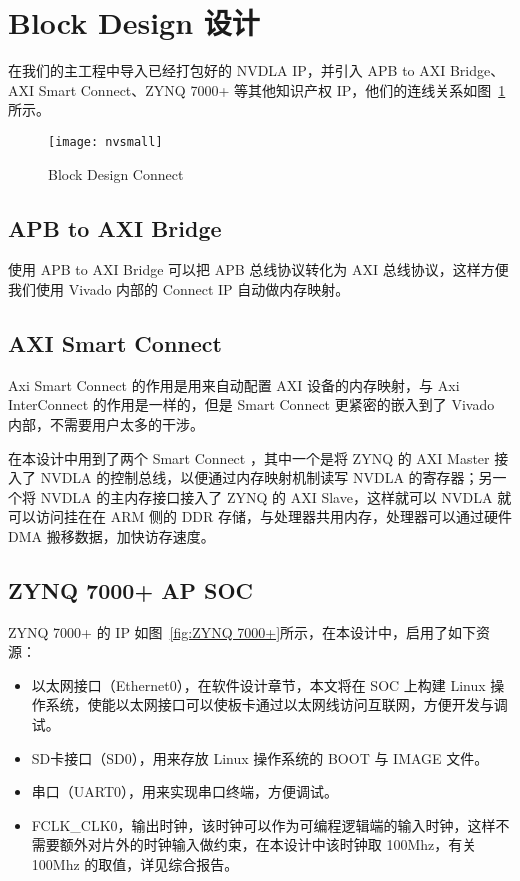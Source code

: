 \section{Block Design 设计}

在我们的主工程中导入已经打包好的 NVDLA IP，并引入 APB to AXI Bridge、AXI Smart Connect、ZYNQ 7000+ 等其他知识产权 IP，他们的连线关系如图~\ref{fig:Block Design Connect}所示。

\begin{figure}[!htbp]
    \centering
    \texttt{[image: nvsmall]}
    \caption{Block Design Connect}
    \label{fig:Block Design Connect}
\end{figure}

\subsection{APB to AXI Bridge}

使用 APB to AXI Bridge 可以把 APB 总线协议转化为 AXI 总线协议，这样方便我们使用 Vivado 内部的 Connect IP 自动做内存映射。

\subsection{AXI Smart Connect}

Axi Smart Connect 的作用是用来自动配置 AXI 设备的内存映射，与 Axi InterConnect 的作用是一样的，但是 Smart Connect 更紧密的嵌入到了 Vivado 内部，不需要用户太多的干涉。

在本设计中用到了两个 Smart Connect ，其中一个是将 ZYNQ 的 AXI Master 接入了 NVDLA 的控制总线，以便通过内存映射机制读写 NVDLA 的寄存器；另一个将 NVDLA 的主内存接口接入了 ZYNQ 的 AXI Slave，这样就可以 NVDLA 就可以访问挂在在 ARM 侧的 DDR 存储，与处理器共用内存，处理器可以通过硬件 DMA 搬移数据，加快访存速度。

\subsection{ZYNQ 7000+ AP SOC}

ZYNQ 7000+ 的 IP 如图~\ref{fig:ZYNQ 7000+}所示，在本设计中，启用了如下资源：

\begin{itemize}
    \item 以太网接口（Ethernet0），在软件设计章节，本文将在 SOC 上构建 Linux 操作系统，使能以太网接口可以使板卡通过以太网线访问互联网，方便开发与调试。
    \item SD卡接口（SD0），用来存放 Linux 操作系统的 BOOT 与 IMAGE 文件。
    \item 串口（UART0），用来实现串口终端，方便调试。
    \item FCLK\_CLK0，输出时钟，该时钟可以作为可编程逻辑端的输入时钟，这样不需要额外对片外的时钟输入做约束，在本设计中该时钟取 100Mhz，有关 100Mhz 的取值，详见综合报告。
\end{itemize}

